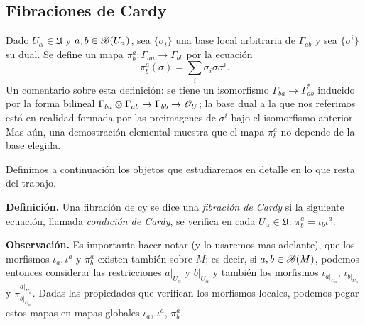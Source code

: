 {%
\subsection{Fibraciones de Cardy}

Dado $U_\alpha \in \mathfrak{U}$ y $a,b \in \mathscr{B}(U_\alpha )$, sea $\{\sigma_i\}$ una base local arbitraria de $\Gamma_{ab}$ y sea $\{\sigma^i\}$ su dual. Se define un mapa $\pi^a_b:\Gamma_{aa}\to \Gamma_{bb}$ por la ecuaci\'on
$$\pi^a_b(\sigma )=\sum_i\sigma_i\sigma \sigma^i.$$
Un comentario sobre esta definici\'on: se tiene un isomorfismo $\Gamma_{ba}\to \Gamma_{ab}^*$ inducido por la forma bilineal $\Gamma_{ba}\otimes \Gamma_{ab}\to \Gamma_{bb}\to \mathscr{O}_U$; la base dual a la que nos referimos est\'a en realidad formada por las preimagenes de $\sigma^i$ bajo el isomorfismo anterior. Mas a\'un, una demostraci\'on elemental muestra que el mapa $\pi^a_b$ no depende de la base elegida.

Definimos a continuaci\'on los objetos que estudiaremos en detalle en lo que resta del trabajo.
\medskip

{\bf Definici\'on.} Una fibraci\'on de {\sc cy} se dice una \emph{fibraci\'on de Cardy} si la siguiente ecuaci\'on, llamada \emph{condici\'on de Cardy}, se verifica en cada $U_\alpha \in \mathfrak{U}$: $\pi^a_b=\iota_b\iota^a$.
\medskip

{\bf Observaci\'on.} Es importante hacer notar (y lo usaremos mas adelante), que los morfismos $\iota_a,\iota^a$ y $\pi^a_b$ existen tambi\'en sobre $M$; es decir, si $a,b\in \mathscr{B}(M)$, podemos entonces considerar las restricciones $a|_{U_\alpha}$ y $b|_{U_\alpha}$ y tambi\'en los morfismos $\iota_{a|_{U_\alpha}}$, $\iota_{b|_{U_\alpha}}$ y $\pi^{a|_{U_\alpha}}_{b|_{U_\alpha}}$. Dadas las propiedades que verifican los morfismos locales, podemos pegar estos mapas en mapas globales $\iota_a$, $\iota^a$, $\pi^a_b$.









}








